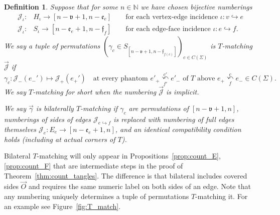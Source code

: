 \documentclass{amsart}
\newtheorem{definition}[conjecture]{Definition}
\newcommand{\corner}[1][]{
 \underset{f#1}
 {
  \overset{c#1}{\curvearrowleft}
 }
}
\begin{document}
\begin{definition}\label{def:T_compat}
Suppose that for some $n\in\mathbb{N}$ we have chosen bijective numberings
\begin{align*}
\mathcal{J}_\iota\colon&H_\iota\to[n-\mathfrak{v}+1,n-\mathfrak{e}_e]\qquad\text{for each vertex-edge incidence }\iota\colon v\hookrightarrow e\\
\mathcal{J}_\iota\colon&S_\iota\to[n-\mathfrak{e}_e+1,n-\mathfrak{f}_f]\qquad\text{for each edge-face incidence }\iota\colon e\hookrightarrow f.
\end{align*}
We say a tuple of permutations $\left(\gamma_c\in S_{[n-\mathfrak{v}+1,n-\mathfrak{f}_{f(c)}]}\right)_{c\in C(\Sigma)}$ is \emph{$T$-matching $\vec{\mathcal{J}}$} if
\begin{equation*}
\gamma_c\colon\mathcal{J}_-(e_-')\mapsto\mathcal{J}_+(e_+')\quad\text{at every phantom }e'_+\corner[']e'_-\text{ of }T\text{ above }e_+\corner e_-\in C(\Sigma).
\end{equation*}
We say \emph{$T$-matching} for short when the numbering $\vec{\mathcal{J}}$ is implicit.

We say $\vec\gamma$ is \emph{bilaterally $T$-matching} if $\gamma_c$ are permutations of $[n-\mathfrak{v}+1,n]$, numberings of sides of edges $\mathcal{J}_{e\hookrightarrow f}$ is replaced with numbering of full edges themselves $\mathcal{J}_e\colon E_e\to[n-\mathfrak{e}_e+1,n]$, and an identical compatibility condition holds (including at actual corners of $T$).
\end{definition}
Bilateral $T$-matching will only appear in Propositions~\ref{prop:count_E},\ref{prop:count_F} that are intermediate steps in the proof of Theorem~\ref{thm:count_tangles}. The difference is that bilateral includes covered sides $\vec{O}$ and requires the same numeric label on both sides of an edge. Note that any numbering uniquely determines a tuple of permutations $T$-matching it. For an example see Figure~\ref{fig:T_match}.
\end{document}
